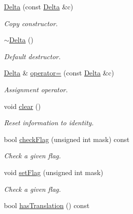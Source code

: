 \begin{DoxyCompactItemize}
\hyperlink{class_d_d4hep_1_1_alignments_1_1_delta_a3fcd404a6a78a214f1c655a07d3db46d}{Delta} (const \hyperlink{class_d_d4hep_1_1_alignments_1_1_delta}{Delta} \&c)
\begin{DoxyCompactList}\small\item\em Copy constructor. \item\end{DoxyCompactList}\item 
\hyperlink{class_d_d4hep_1_1_alignments_1_1_delta_a7eff633a0f57a904c8a125178e9ba3b8}{$\sim$Delta} ()
\begin{DoxyCompactList}\small\item\em Default destructor. \item\end{DoxyCompactList}\item 
\hyperlink{class_d_d4hep_1_1_alignments_1_1_delta}{Delta} \& \hyperlink{class_d_d4hep_1_1_alignments_1_1_delta_afb22b2e26ceb2bb74b5fae0f2415abdd}{operator=} (const \hyperlink{class_d_d4hep_1_1_alignments_1_1_delta}{Delta} \&c)
\begin{DoxyCompactList}\small\item\em Assignment operator. \item\end{DoxyCompactList}\item 
void \hyperlink{class_d_d4hep_1_1_alignments_1_1_delta_a7262de6cf3b79dea8fd3b7ff86e10e10}{clear} ()
\begin{DoxyCompactList}\small\item\em Reset information to identity. \item\end{DoxyCompactList}\item 
bool \hyperlink{class_d_d4hep_1_1_alignments_1_1_delta_a032579329da702161e55ec9fc2366955}{checkFlag} (unsigned int mask) const 
\begin{DoxyCompactList}\small\item\em Check a given flag. \item\end{DoxyCompactList}\item 
void \hyperlink{class_d_d4hep_1_1_alignments_1_1_delta_a395852746451e6e2de16e829161a5ac3}{setFlag} (unsigned int mask)
\begin{DoxyCompactList}\small\item\em Check a given flag. \item\end{DoxyCompactList}\item 
bool \hyperlink{class_d_d4hep_1_1_alignments_1_1_delta_a8f3a0954d20782c7fa2c3aec4553dafa}{hasTranslation} () const 

\end{DoxyCompactItemize}
